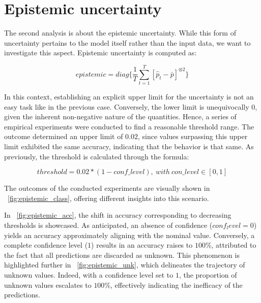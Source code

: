 \section{Epistemic uncertainty}

The second analysis is about the epistemic uncertainty. While this form of uncertainty pertains to the model itself rather than the input data, we want to investigate this aspect. Epistemic uncertainty is computed as:

\[
	epistemic = diag\{\frac{1}{T} \sum_{t=1}^{T} [\hat{p}_t - \bar{p}]^{\otimes 2}\}
\]

In this context, establishing an explicit upper limit for the uncertainty is not an easy task like in the previous case. Conversely, the lower limit is unequivocally $0$, given the inherent non-negative nature of the quantities. Hence, a series of empirical experiments were conducted to find a reasonable threshold range. The outcome determined an upper limit of $0.02$, since values surpassing this upper limit exhibited the same accuracy, indicating that the behavior is that same. As previously, the threshold is calculated through the formula:

\[
	threshold = 0.02 * (1 - conf \_ level), \ with \ con \_ level \in [0,1]
\]

The outcomes of the conducted experiments are visually shown in \Fig~\ref{fig:epistemic_class}, offering different insights into this scenario.

In \Fig~\ref{fig:epistemic_acc}, the shift in accuracy corresponding to decreasing thresholds is showcased. As anticipated, an absence of confidence ($conf_level = 0$) yields an accuracy approximately aligning with the nominal value. Conversely, a complete confidence level ($1$) results in an accuracy raises to $100\%$, attributed to the fact that all predictions are discarded as unknown. This phenomenon is highlighted further in \Fig~\ref{fig:epistemic_unk}, which delineates the trajectory of unknown values. Indeed, with a confidence level set to $1$, the proportion of unknown values escalates to $100\%$, effectively indicating the inefficacy of the predictions.

